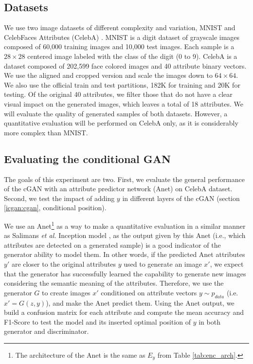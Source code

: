 \documentclass{article}
\begin{document}
\subsection{Datasets} \label{subsec:data}
We use two image datasets of different complexity and variation, MNIST \citep{LeCun1998} and CelebFaces Attributes (CelebA) \citep{celeba}. MNIST is a digit dataset of grayscale images composed of 60,000 training images and 10,000 test images. Each sample is a $28\times28$ centered image labeled with the class of the digit (0 to 9). CelebA is a dataset composed of 202,599 face colored images and 40 attribute binary vectors. We use the aligned and cropped version and scale the images down to $64\times64$. We also use the official train and test partitions, 182K for training and 20K for testing. Of the original 40 attributes, we filter those that do not have a clear visual impact on the generated images, which leaves a total of 18 attributes. 
We will evaluate the quality of generated samples of both datasets. However, a quantitative evaluation will be performed on CelebA only, as it is considerably more complex than MNIST. 

\subsection{Evaluating the conditional GAN} \label{subsec:cGAN_exp}
The goals of this experiment are two. First, we evaluate the general performance of the cGAN with an attribute predictor network (Anet) on CelebA dataset. Second, we test the impact of adding $y$ in different layers of the cGAN (section \ref{icgan:cgan}, conditional position). 

We use an Anet\footnote{The architecture of the Anet is the same as $E_y$ from Table \ref{tab:enc_arch}.} as a way to make a quantitative evaluation in a similar manner as Salimans \textit{et al.} Inception model \cite{Salimans2016}, as the output given by this Anet (i.e., which attributes are detected on a generated sample) is a good indicator of the generator ability to model them. In other words, if the predicted Anet attributes $y'$ are closer to the original attributes $y$ used to generate an image $x'$, we expect that the generator has successfully learned the capability to generate new images considering the semantic meaning of the attributes. Therefore, we use the generator $G$ to create images $x'$ conditioned on attribute vectors $y \sim p_{data}$ (i.e. $x' = G(z,y)$), and make the Anet predict them. Using the Anet output, we build a confusion matrix for each attribute and compute the mean accuracy and F1-Score to test the model and its inserted optimal position of $y$ in both generator and discriminator.
\end{document}
